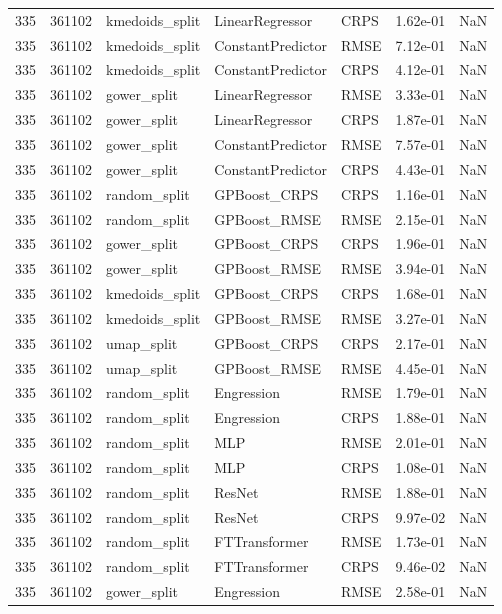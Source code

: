 \begin{tabular}{rrlllrr}
335 & 361102 & kmedoids\_split & LinearRegressor & CRPS & 1.62e-01 & NaN \\
335 & 361102 & kmedoids\_split & ConstantPredictor & RMSE & 7.12e-01 & NaN \\
335 & 361102 & kmedoids\_split & ConstantPredictor & CRPS & 4.12e-01 & NaN \\
335 & 361102 & gower\_split & LinearRegressor & RMSE & 3.33e-01 & NaN \\
335 & 361102 & gower\_split & LinearRegressor & CRPS & 1.87e-01 & NaN \\
335 & 361102 & gower\_split & ConstantPredictor & RMSE & 7.57e-01 & NaN \\
335 & 361102 & gower\_split & ConstantPredictor & CRPS & 4.43e-01 & NaN \\
335 & 361102 & random\_split & GPBoost\_CRPS & CRPS & 1.16e-01 & NaN \\
335 & 361102 & random\_split & GPBoost\_RMSE & RMSE & 2.15e-01 & NaN \\
335 & 361102 & gower\_split & GPBoost\_CRPS & CRPS & 1.96e-01 & NaN \\
335 & 361102 & gower\_split & GPBoost\_RMSE & RMSE & 3.94e-01 & NaN \\
335 & 361102 & kmedoids\_split & GPBoost\_CRPS & CRPS & 1.68e-01 & NaN \\
335 & 361102 & kmedoids\_split & GPBoost\_RMSE & RMSE & 3.27e-01 & NaN \\
335 & 361102 & umap\_split & GPBoost\_CRPS & CRPS & 2.17e-01 & NaN \\
335 & 361102 & umap\_split & GPBoost\_RMSE & RMSE & 4.45e-01 & NaN \\
335 & 361102 & random\_split & Engression & RMSE & 1.79e-01 & NaN \\
335 & 361102 & random\_split & Engression & CRPS & 1.88e-01 & NaN \\
335 & 361102 & random\_split & MLP & RMSE & 2.01e-01 & NaN \\
335 & 361102 & random\_split & MLP & CRPS & 1.08e-01 & NaN \\
335 & 361102 & random\_split & ResNet & RMSE & 1.88e-01 & NaN \\
335 & 361102 & random\_split & ResNet & CRPS & 9.97e-02 & NaN \\
335 & 361102 & random\_split & FTTransformer & RMSE & 1.73e-01 & NaN \\
335 & 361102 & random\_split & FTTransformer & CRPS & 9.46e-02 & NaN \\
335 & 361102 & gower\_split & Engression & RMSE & 2.58e-01 & NaN \\

\end{tabular}

